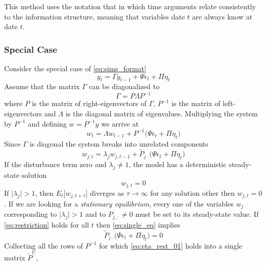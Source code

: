 \documentclass[a4paper,10pt]{article}  %
\begin{document}
This method uses the notation that in which time arguments relate consistently to the information structure, meaning
that variables date $ t $ are always know at date $ t $.

\subsubsection{Special Case} %
\label{sub:special_case}

Consider the special case of \eqref{eq:sims_format}
\[
   y_t = \Gamma y_{t-1} + \Psi \epsilon_t +\Pi \eta_t
\]
Assume that the matrix $ \Gamma $ can be diagonalized to
\[
   \Gamma = P \Lambda P^{-1}
\]
where $ P $ is the matrix of right-eigenvectors of $ \Gamma $, $ P^{-1} $ is the matrix of left-eigenvectors
and $ \Lambda $ is the diagonal matrix of eigenvalues. Multiplying the system by $ P^{-1} $ and defining $ w = P^{-1} y $
we arrive at
\begin{equation}
   \label{eq:diag_system}
   w_t = \Lambda w_{t-1} + P^{-1} \Big( \Psi \epsilon_t + \Pi \eta_t \Big)
\end{equation}
Since $\Gamma$ is diagonal the system breaks into unrelated components
\begin{equation}
   \label{eq:single_eq}
   w_{j,t} = \lambda_j w_{j,t-1} + \tilde{P}_{j\cdot} \Big( \Psi \epsilon_t + \Pi \eta_t \Big)
\end{equation}
If the disturbance term zero and $ \lambda_j \ne 1$, the model has a deterministic steady-state solution 
\begin{equation}
   \label{eq:restriction}
   w_{j,t} = 0 
\end{equation}
If $ \lvert \lambda_j \rvert > 1$, then $ E_t\big[ w_{j,t+\tau} \big] $ diverges as $ \tau\rightarrow \infty $ for any
solution other then $ w_{j,t} = 0 $. If we are looking for a \emph{stationary equilibrium}, every one of 
the variables $ w_j $ corresponding to $ \lvert \lambda_j \rvert > 1 $ and to $ P_{j,:}\ne 0 $ must be set to its steady-state value. 
If \eqref{eq:restriction} holds for all $ t $ then \eqref{eq:single_eq} implies
\begin{equation}
   \label{eq:eta_rest_01}
   \tilde{P}_{j\cdot} \Big( \Psi \epsilon_t + \Pi \eta_t \Big) = 0 
\end{equation}
Collecting all the rows of $ P^{-1} $ for which \eqref{eq:eta_rest_01} holds into a single matrix $ \tilde{P}^U $, 
\end{document}

